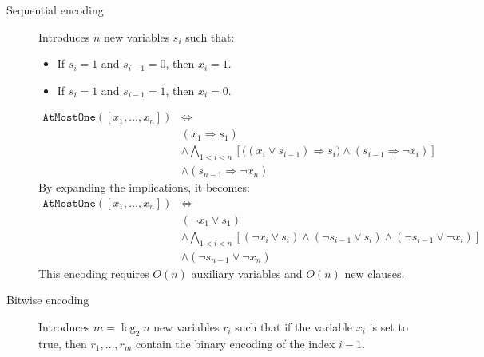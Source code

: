 \begin{description}
\begin{description}
\begin{description}
                    \item[Sequential encoding] 
                        Introduces $n$ new variables $s_i$ such that:
                        \begin{itemize}
                            \item If $s_i = 1$ and $s_{i-1} = 0$, then $x_i = 1$.
                            \item If $s_i = 1$ and $s_{i-1} = 1$, then $x_i = 0$.
                        \end{itemize}
                        \[ 
                            \begin{split}
                                \texttt{AtMostOne}([x_1, \dots, x_n]) &\iff \\
                                & (x_1 \Rightarrow s_1) \\
                                & \land \bigwedge_{1 < i < n} \left[ \big( (x_i \vee s_{i-1}) \Rightarrow s_i \big) \land (s_{i-1} \Rightarrow \lnot x_i) \right] \\
                                & \land (s_{n-1} \Rightarrow \lnot x_n)
                            \end{split}
                        \]
                        By expanding the implications, it becomes:
                        \[ 
                            \begin{split}
                                \texttt{AtMostOne}([x_1, \dots, x_n]) &\iff \\
                                & (\lnot x_1 \vee s_1) \\
                                & \land \bigwedge_{1 < i < n} \left[ (\lnot x_i \vee s_i) \land (\lnot s_{i-1} \vee s_i) \land (\lnot s_{i-1} \vee \lnot x_i) \right] \\
                                & \land (\lnot s_{n-1} \vee \lnot x_n)
                            \end{split}
                        \]
                        This encoding requires $O(n)$ auxiliary variables and $O(n)$ new clauses.

                    \item[Bitwise encoding] 
                        Introduces $m = \log_2n$ new variables $r_i$ such that 
                        if the variable $x_i$ is set to true, then $r_1, \dots, r_m$ contain the binary encoding of the index $i-1$.
                        

\end{description}
\end{description}
\end{description}
